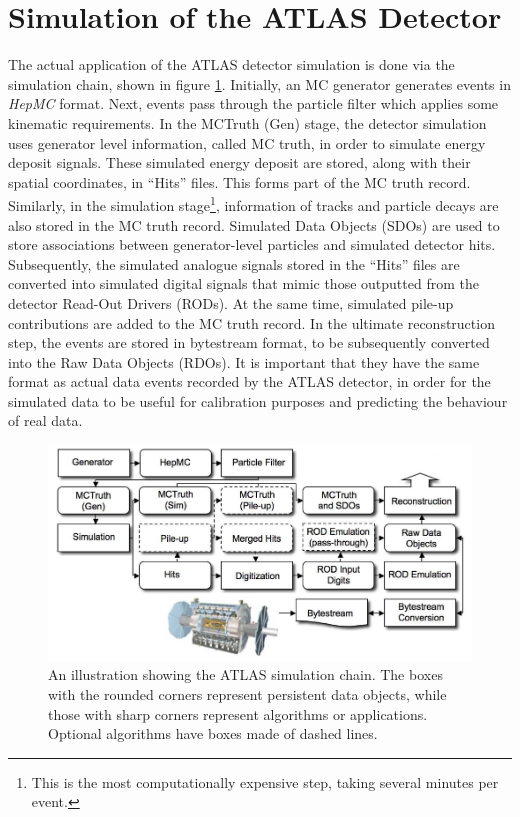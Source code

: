 \section{Simulation of the ATLAS Detector}
The actual application of the ATLAS detector simulation is done via the simulation chain, shown in figure \ref{sim_chain}. Initially, an MC generator generates events in \emph{HepMC} \cite{HEPMC} format. Next, events pass through the particle filter which applies some kinematic requirements. In the MCTruth (Gen) stage, the detector simulation uses generator level information, called MC truth, in order to simulate energy deposit signals. These simulated energy deposit are stored, along with their spatial coordinates, in ``Hits'' files. This forms part of the MC truth record. Similarly, in the simulation stage\footnote{This is the most computationally expensive step, taking several minutes per event.}, information of tracks and particle decays are also stored in the MC truth record. Simulated Data Objects (SDOs) are used to store associations between generator-level particles and simulated detector hits. Subsequently, the simulated analogue signals stored in the ``Hits'' files are converted into simulated digital signals that mimic those outputted from the detector Read-Out Drivers (RODs). At the same time, simulated pile-up contributions are added to the MC truth record. In the ultimate reconstruction step, the events are stored in bytestream format, to be subsequently converted into the Raw Data Objects (RDOs). It is important that they have the same format as actual data events recorded by the ATLAS detector, in order for the simulated data to be useful for calibration purposes and predicting the behaviour of real data.
\begin{figure}
\centering
\includegraphics[scale=0.5]{images/atlas_sim_chain}
\caption{An illustration showing the ATLAS simulation chain. The boxes with the rounded corners represent persistent data objects, while those with sharp corners represent algorithms or applications. Optional algorithms have boxes made of dashed lines. \cite{ATLAS_sim}}
\label{sim_chain}
\end{figure}